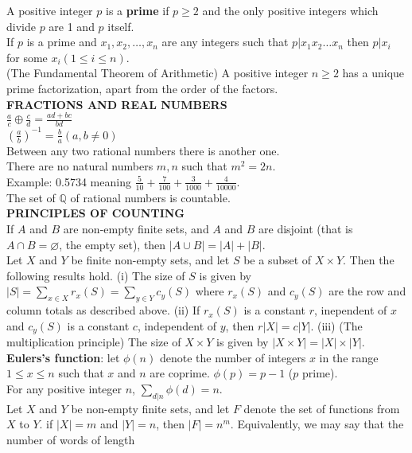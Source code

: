 \documentclass[10pt,landscape]{article}
\begin{document}
\begin{multicols}{4}
A positive integer $p$ is a \textbf{prime} if $p \geq 2$ and the only positive integers which divide $p$ are 1 and $p$ itself.\\
If $p$ is a prime and $x_1, x_2, \dotsc ,x_n$ are any integers such that $p|x_1 x_2 \dots x_n$ then $p|x_i$ for some $x_i(1 \leq i \leq n)$.\\
(The Fundamental Theorem of Arithmetic) A positive integer $n \geq 2$
has a unique prime factorization, apart from the order of the
factors.\\
\textbf{FRACTIONS AND REAL NUMBERS}\\
$\frac{a}{c} \oplus \frac{c}{d} = \frac{ad + bc}{bd}$\\
$\left( \frac{a}{b} \right)^{-1} = \frac{b}{a} (a,b \neq 0)$\\
Between any two rational numbers there is another one.\\
There are no natural numbers $m, n$ such that $m^2 =2n$.\\
Example: 0.5734 meaning $\frac{5}{10} + \frac{7}{100} + \frac{3}{1000}
+ \frac {4}{10000}$.\\
The set of $\mathbb{Q}$ of rational numbers is countable.\\
\textbf{PRINCIPLES OF COUNTING}\\
If $A$ and $B$ are non-empty finite sets, and $A$ and $B$ are disjoint
(that is $A \cap B = \varnothing$, the empty set), then $|A \cup B| =
|A| + |B|$.\\
Let $X$ and $Y$ be finite non-empty sets, and let $S$ be a subset of
$X \times Y$. Then the following results hold.
(i) The size of $S$ is given by $|S| = \displaystyle\sum_{x \in X} r_{x}(S) =
\displaystyle\sum_{y \in Y} c_{y}(S)$ where $r_{x}(S)$ and $c_{y}(S)$
are the row and column totals as described above.
(ii) If $r_{x}(S)$ is a constant $r$, inependent of $x$ and $c_{y}(S)$
is a constant $c$, independent of $y$, then $r|X| = c|Y|$.
(iii) (The multiplication principle) The size of $X \times Y$ is given
by $|X \times Y| = |X| \times |Y|$.\\
\textbf{Eulers's function}: let $\phi(n)$ denote the number of
integers $x$ in the range $1 \leq x \leq n$ such that $x$ and $n$ are
coprime. $\phi(p) = p-1$ ($p$ prime).\\
For any positive integer $n$, $\displaystyle\sum_{d|n} \phi(d)=n$.\\
Let $X$ and $Y$ be non-empty finite sets, and let $F$ denote the set
of functions from $X$ to $Y$. if $|X| = m$ and $|Y| = n$, then $|F| =
n^{m}$. Equivalently, we may say that the number of words of length

\end{multicols}
\end{document}
